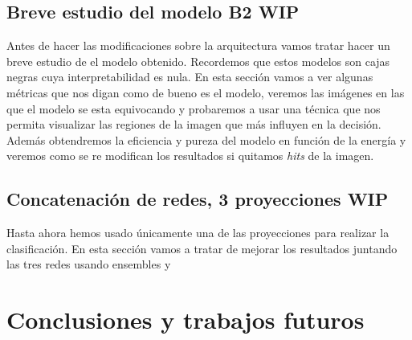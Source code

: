 \documentclass[a4paper,12pt,twoside,titlepage]{article}
\begin{document}
\subsection{Breve estudio del modelo B2 WIP}

Antes de hacer las modificaciones sobre la arquitectura vamos tratar hacer un breve estudio de el modelo obtenido. Recordemos que estos modelos son cajas negras cuya interpretabilidad es nula. En esta sección vamos a ver algunas métricas que nos digan como de bueno es el modelo, veremos las imágenes en las que el modelo se esta equivocando y probaremos a usar una técnica que nos permita visualizar las regiones de la imagen que más influyen en la decisión. Además obtendremos la eficiencia y pureza del modelo en función de la energía y veremos como se re modifican los resultados si quitamos \textit{hits} de la imagen.

\subsection{Concatenación de redes, 3 proyecciones WIP}

Hasta ahora hemos usado únicamente una de las proyecciones para realizar la clasificación. En esta sección vamos a tratar de mejorar los resultados juntando las tres redes usando ensembles y





\section{Conclusiones y trabajos futuros}
\end{document}
